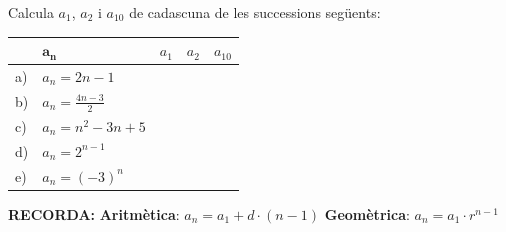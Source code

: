 \begin{mylist}
		\item Calcula $a_1$, $a_2$ i $a_{10}$ de cadascuna de les successions següents:
	\begin{center}
		\renewcommand{\arraystretch}{1.5}
		\begin{longtable}{|p{}|p{}|p{}|p{}|p{}|} \hline 
		\rowcolor{lightgray}	& $\mathbf{a_n}$ & $a_1$ & $a_2$ & $a_{10}$ \\ \hline
		\cellcolor{lightgray}	a) & $a_n = 2n-1$ &  &  &  \\ \hline
		\cellcolor{lightgray}	b) & $a_n = \frac{4n-3}{2}$ & & & \\ \hline
		\cellcolor{lightgray}	c) & $a_n = n^2 -3n+5$ & & & \\  \hline
		\cellcolor{lightgray}	d) & $a_n = 2^{n-1}$ & & & \\  \hline
		\cellcolor{lightgray}	e) & $a_n= (-3)^n$ & & & \\  \hline
		\end{longtable}	
	\end{center}	
\end{mylist}
 

\newpage
 
	
\setcounter{myenumi}{0}



\begin{center}
	\textbf{RECORDA:} 
	\textbf{Aritmètica}: $a_n=a_1+d\cdot (n-1)$ \qquad \textbf{Geomètrica}: $a_n= a_1 \cdot r^{n-1}$
\end{center}

